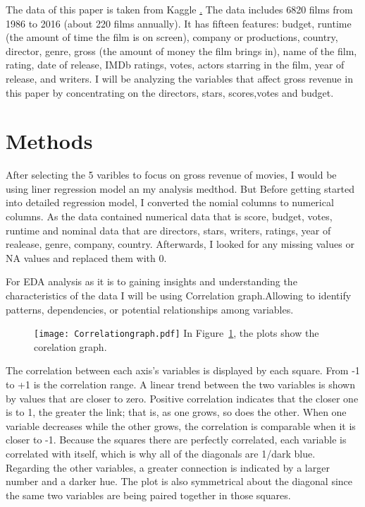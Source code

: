 \documentclass[12pt]{article}
\begin{document}
The data of this paper is taken from Kaggle \href{https://www.kaggle.com/datasets/danielgrijalvas/movies}. 
The data includes 6820 films from 1986 to 2016 (about 220 films annually). It has
fifteen features: budget, runtime (the amount of time the film is on screen), company 
or productions, country, director, genre, gross (the amount of money the film brings in), 
name of the film, rating, date of release, IMDb ratings, votes, actors starring in the
film, year of release, and writers. I will be analyzing the variables that affect
gross revenue in this paper by concentrating on the directors, stars, scores,votes and budget.

\section{Methods}
\label{sec:meth}

After selecting the 5 varibles to focus on gross revenue of movies, I would be using
liner regression model an my analysis medthod. But Before getting started into detailed 
regression model, I converted the nomial columns to numerical columns. As the data contained 
numerical data that is score, budget, votes, runtime and nominal data that are directors, 
stars, writers, ratings, year of realease, genre, company, country. Afterwards, I looked 
for any missing values or NA values and replaced them with 0.

For EDA analysis as it is to gaining insights and understanding the characteristics 
of the data I will be using Correlation graph.Allowing to identify patterns, dependencies,
or potential relationships among variables.

\begin{figure}
  \centering
	\texttt{[image: Correlationgraph.pdf]}
	\label{fig:Correlationgraph}
In Figure~\ref{fig:Correlationgraph}, the plots show the corelation graph.
\end{figure}

The correlation between each axis’s variables is displayed by each square. From 
-1 to +1 is the correlation range. A linear trend between the two variables is shown
by values that are closer to zero. Positive correlation indicates that the closer one 
is to 1, the greater the link; that is, as one grows, so does the other. When one variable 
decreases while the other grows, the correlation is comparable when it is closer to -1.
Because the squares there are perfectly correlated, each variable is correlated with itself,
which is why all of the diagonals are 1/dark blue. Regarding the other variables, a greater 
connection is indicated by a larger number and a darker hue. The plot is also symmetrical
about the diagonal since the same two variables are being paired together in those squares.
\end{document}
